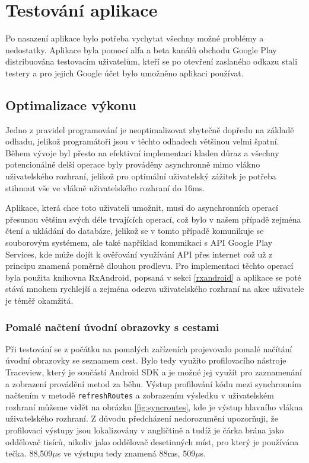 \documentclass[czech,master,public,dept460,male,java,cpdeclaration]{diploma}
\begin{document}
\section{Testování aplikace}
Po nasazení aplikace bylo potřeba vychytat všechny možné problémy a nedostatky.
Aplikace byla pomocí alfa a beta kanálů obchodu Google Play
distribuována testovacím uživatelům, kteří se po otevření zaslaného odkazu stali testery a pro jejich
Google účet bylo umožněno aplikaci používat.

\subsection{Optimalizace výkonu}
Jedno z pravidel programování je neoptimalizovat zbytečně dopředu na základě odhadu,
jelikož programátoři jsou v těchto odhadech většinou velmi špatní. Během vývoje byl přesto na efektivní
implementaci kladen důraz a všechny potencionálně delší operace byly prováděny asynchronně mimo vlákno
uživatelského rozhraní, jelikož pro optimální uživatelský zážitek je potřeba stihnout vše ve vlákně
uživatelského rozhraní do 16ms\cite{perf}.

Aplikace, která chce toto uživateli umožnit, musí do asynchronních operací přesunou většinu svých déle
trvajících operací, což bylo v našem případě zejména čtení a ukládání do databáze, jelikož se v tomto
 případě komunikuje se souborovým systémem, ale také například komunikaci s API Google Play Services,
 kde může dojít k ověřování využívání API přes internet což už z principu znamená poměrně dlouhou
 prodlevu. Pro implementaci těchto operací byla použita knihovna RxAndroid, popsaná v sekci \ref{rxandroid}
 a aplikace se poté stává mnohem rychlejší a zejména odezva uživatelského rozhraní
 na akce uživatele je téměř okamžitá.

\subsubsection{Pomalé načtení úvodní obrazovky s cestami}
 Při testování se z počátku na pomalých zařízeních projevovalo pomalé načítání úvodní obrazovky se
 seznamem cest. Bylo tedy využito profilovacího nástroje Traceview, který je součástí Android SDK
  a je možné jej využít pro zaznamenání a zobrazení provádění metod za běhu. Výstup profilování kódu
  mezi synchronním načtením v metodě \texttt{refreshRoutes} a zobrazením výsledku v uživatelském rozhraní
  můžeme vidět na obrázku \ref{fig:syncroutes}, kde je výstup hlavního vlákna uživatelského rozhraní.
  Z důvodu předcházení nedorozumění upozorňuji, že profilovací výstupy jsou lokalizovány
  v angličtině a tudíž je čárka brána jako oddělovač tisíců, nikoliv jako oddělovač desetinných míst,
  pro který je používána tečka. 88,509$\mu$s ve výstupu tedy znamená 88ms, 509$\mu$s.
\end{document}
